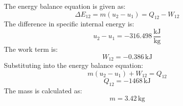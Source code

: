 The energy balance equation is given as:  
\[
\Delta E_{12} = m(u_2 - u_1) = Q_{12} - W_{12}
\]  
The difference in specific internal energy is:  
\[
u_2 - u_1 = -316.498 \, \frac{\text{kJ}}{\text{kg}}
\]  
The work term is:  
\[
W_{12} = -0.386 \, \text{kJ}
\]  
Substituting into the energy balance equation:  
\[
m(u_2 - u_1) + W_{12} = Q_{12}
\]  
\[
Q_{12} = -1468 \, \text{kJ}
\]  
The mass is calculated as:  
\[
m = 3.42 \, \text{kg}
\]